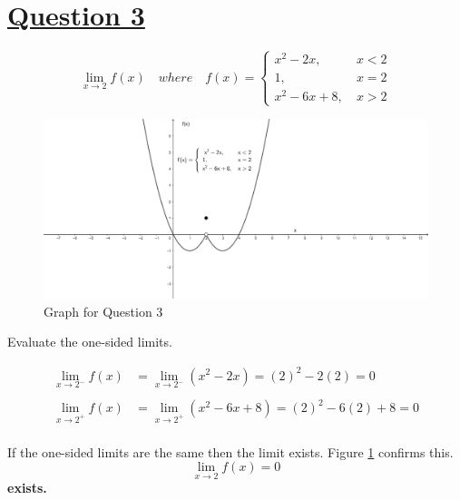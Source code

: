 \documentclass[16pt]{article}
\begin{document}
\section*{\underline{Question 3}}
\begin{huge}
\[ \lim_{x \to 2}f(x) \quad where \quad f(x) = \begin{cases} 
	x^{2} - 2x, \ & x < 2 \\
	1, \ & x = 2 \\
	x^{2} - 6x + 8, \ & x > 2 
\end{cases}
\]
\end{huge}

\begin{figure}[h]
	\includegraphics[width=\textwidth]{graph3a.jpg}
	\caption{Graph for Question 3}
	\label{graph3}
\end{figure}

\vspace{1cm}

\huge{Evaluate the one-sided limits.}

\begin{align*}
	\lim_{x\to2^-} f(x) & = \lim_{x\to2^-} (x^2 - 2x) = (2)^2 -2(2) = 0 \\
	&
	\\
	\lim_{x\to2^+} f(x) & =  \lim_{x\to2^+} (x^2 -6x + 8) = (2)^2 -6(2) + 8 = 0
\end{align*}
\\

If the one-sided limits are the same then the limit exists. Figure \ref{graph3} confirms this. \\
\[ \lim_{x \to 2} f(x) = 0 \] \textbf{exists.}
\end{document}
